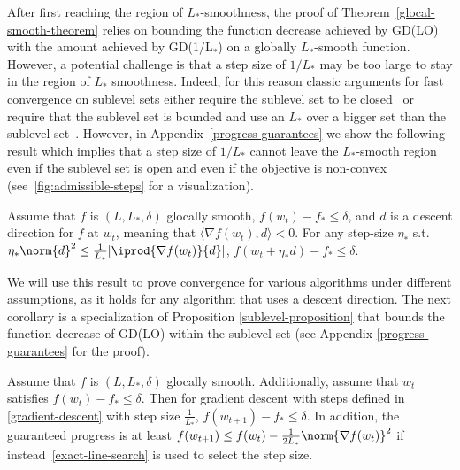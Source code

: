 \documentclass[10pt]{article} %
\begin{document}
After first reaching the region of $L_*$-smoothness, the proof of Theorem~\ref{glocal-smooth-theorem} relies on bounding the function decrease achieved by GD(LO) with the amount achieved by GD(1/L$_*$) on a globally $L_*$-smooth function. However, a potential challenge is that a step size of $1/L_*$ may be too large to stay in the region of $L_*$ smoothness. Indeed, for this reason classic arguments for fast convergence on sublevel sets
either require the sublevel set to be closed~\cite[Chapter~9]{boyd2004} or require that the sublevel set is bounded and use  an $L_*$ over a bigger set than the sublevel set~\cite[Exercise~1.2.5]{bertsekas1997nonlinear}. However, in Appendix~\ref{progress-guarantees} we show the following result which implies that a step size of $1/L_*$ cannot leave the $L_*$-smooth region even if the sublevel set is open and even if the objective is non-convex  (see~\cref{fig:admissible-steps} for a visualization).
\begin{proposition}\label{sublevel-proposition}
    Assume that $f$ is $(L, L_{*}, \delta)$ glocally smooth, $f(w_{t}) - f_{*} \leq \delta$, and $d$ is a descent direction for $f$ at $w_t$, meaning that $\langle \nabla f(w_t), d \rangle < 0$. For any step-size $\eta_*$ s.t. $\eta_{*} \norm{d}^2 \leq \frac{1}{L_{*}} |\iprod{\nabla f(w_{t})}{d}|$, $f(w_{t} + \eta_{*}d) - f_{*} \leq \delta$.
\end{proposition}
 We will use this result to prove convergence for various algorithms under different assumptions, as it holds for any algorithm that uses a descent direction. The next corollary is a specialization of Proposition \ref{sublevel-proposition} that bounds the function decrease of GD(LO) within the sublevel set (see Appendix \ref{progress-guarantees} for the proof).
\begin{corollary}
    \label{sublevel-GD-corollary}
     Assume that $f$ is $(L, L_{*}, \delta)$ glocally smooth. Additionally, assume that $w_{t}$ satisfies $f(w_{t}) - f_{*} \leq \delta$. Then for gradient descent with steps defined in \eqref{gradient-descent} with step size $\frac{1}{L_{*}}$, $f(w_{t+1}) - f_{*} \leq \delta$. In addition, the guaranteed progress is at least $f(w_{t+1}) \leq f(w_{t}) - \frac{1}{2L_{*}}\norm{\nabla f(w_{t})}^2$ if instead~\eqref{exact-line-search} is used to select the step size.
\end{corollary}
\end{document}
